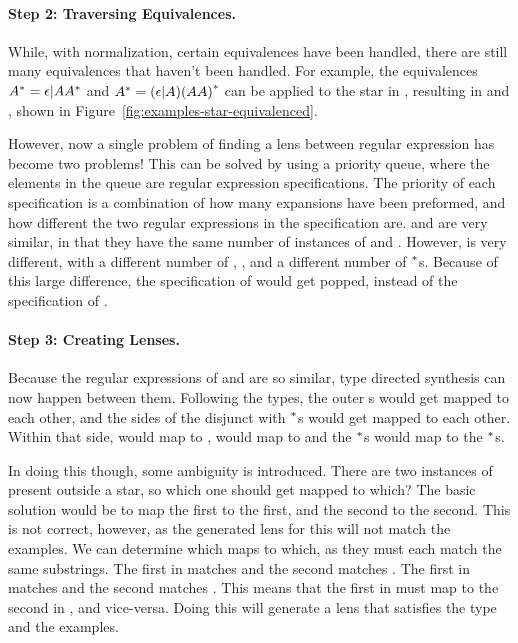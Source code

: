 \documentclass[numbers]{sigplanconf}
\begin{document}
\paragraph*{Step 2:  Traversing Equivalences.}
While, with normalization, certain equivalences have been handled, there are
still many equivalences that haven't been handled.
For example, the equivalences ${A}^*=\epsilon | A{A}^*$ and
${A}^*=(\epsilon | A){(AA)}^*$ can be applied to the star in
, resulting in  and , shown in
Figure~\ref{fig:examples-star-equivalenced}.

However, now a single problem of finding a lens between regular expression has
become two problems!  This can be solved by using a priority queue, where the
elements in the queue are regular expression specifications.  The priority of
each specification is a combination of how many expansions have been preformed,
and how different the two regular expressions in the specification are.
 and  are very similar, in that they have the same
number of instances of  and .  However,  is
very different, with a different number of , , and a
different number of $^*$s.  Because of this large difference, the
specification of  would get popped, instead of the
specification of .

\paragraph*{Step 3: Creating Lenses.}
Because the regular expressions of   and  are so
similar, type directed synthesis can now happen between them.
Following the types, the outer s
would get mapped to each other, and the sides of the disjunct with $^*$s
would get mapped to each other.  Within that side,  would map to
,  would map to  and the $^*$s would map to the
$^*$s.

In doing this though, some ambiguity is introduced.  There are two
instances of  present outside a star, so which one should get mapped to
which?  The basic solution would be to map the first to the first, and the
second to the second.  This is not correct, however, as the generated lens for
this will not match the examples.  We can determine which maps to which, as they
must each match the same substrings.  The first  in 
matches  and the second matches .  The first  in
 matches  and the second matches .
This means that the first  in  must map to the second
 in , and vice-versa.  Doing this will generate a lens
that satisfies the type and the examples.
\end{document}
